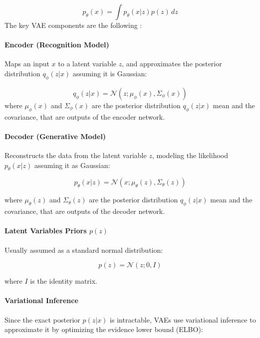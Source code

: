 \documentclass{ieeeaccess}
\begin{document}
\begin{equation}
p_\theta(x) = \int p_\theta(x | z) p(z) \, dz
\end{equation}
The key VAE components are the following :

\paragraph{Encoder (Recognition Model)}
Maps an input $x$ to a latent variable $z$, and approximates the posterior distribution $q_\phi(z | x)$ assuming it is Gaussian:

\begin{equation}
q_\phi(z | x) = \mathcal{N}(z; \mu_\phi(x), \Sigma_\phi(x))
\end{equation}
where $\mu_\phi(x)$ and $\Sigma_\phi(x)$ are the posterior distribution $q_\phi(z | x)$ mean and the covariance, that are outputs of the encoder network.

\paragraph{Decoder (Generative Model)}
Reconstructs the data from the latent variable $z$, modeling the likelihood $p_\theta(x | z)$ assuming it as Gaussian:

\begin{equation}
p_\theta(x | z) = \mathcal{N}(x; \mu_\theta(z), \Sigma_\theta(z))
\end{equation}

where $\mu_\theta(z)$ and $\Sigma_\theta(z)$ are the posterior distribution $q_\phi(z | x)$ mean and the covariance, that are outputs of the decoder network.

\paragraph{Latent Variables Priors $p(z)$}
Usually assumed as a standard normal distribution:

\begin{equation}
p(z) = \mathcal{N}(z; 0, I)
\end{equation}

where $I$ is the identity matrix.

\paragraph{Variational Inference} Since the exact posterior $p(z | x)$ is intractable, VAEs use variational inference to approximate it by optimizing the evidence lower bound (ELBO):
\end{document}

